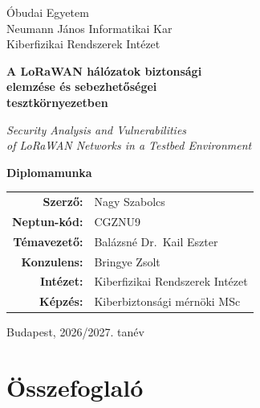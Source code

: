 \documentclass[12pt,a4paper]{article}
\begin{document}

\begin{titlepage}
    \centering
    \vspace*{1cm}
    {\large Óbudai Egyetem\\
    Neumann János Informatikai Kar\\
    Kiberfizikai Rendszerek Intézet}

    \vspace{3cm}
    {\LARGE\bfseries A LoRaWAN hálózatok biztonsági\\[0.3em]
    elemzése és sebezhetőségei\\[0.3em]
    tesztkörnyezetben}

    \vspace{0.5em}
    {\large\itshape Security Analysis and Vulnerabilities\\
    of LoRaWAN Networks in a Testbed Environment}

    \vspace{3cm}
    {\large\bfseries Diplomamunka}

    \vspace{2cm}
    \begin{tabular}{rl}
        \textbf{Szerző:}       & Nagy Szabolcs \\
        \textbf{Neptun-kód:}   & CGZNU9 \\
        \textbf{Témavezető:}   & Balázsné Dr.\ Kail Eszter \\
        \textbf{Konzulens:}    & Bringye Zsolt \\
        \textbf{Intézet:}      & Kiberfizikai Rendszerek Intézet \\
        \textbf{Képzés:}       & Kiberbiztonsági mérnöki MSc \\
    \end{tabular}

    \vfill
    {\large Budapest, 2026/2027. tanév}
\end{titlepage}

\tableofcontents
\newpage

\section*{Összefoglaló}
\end{document}
